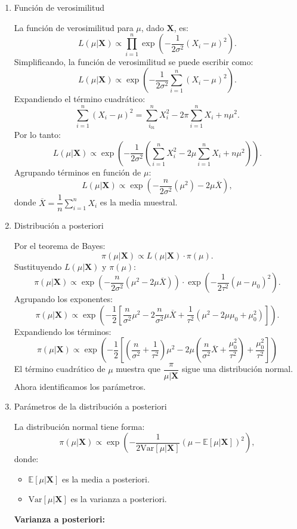 \begin{enumerate}[label=\color{red}\textbf{\arabic*)}]
\begin{enumerate}[label=Paso \arabic*:]
  \item Función de verosimilitud

    La función de verosimilitud para $\mu$, dado $\mathbf{X}$, es: \[
    L(\mu|\mathbf{X})\propto \prod_{i=1}^{n} \exp\left( -\dfrac{1}{2\sigma^2}(X_i-\mu)^2 \right).
    \] 
    Simplificando, la función de verosimilitud se puede escribir como: \[
    L(\mu|\mathbf{X})\propto \exp\left( -\dfrac{1}{2\sigma^2}\sum_{i=1}^{n} (X_i-\mu)^2 \right) .
    \] 
    Expandiendo el término cuadrático: \[
    \sum_{i=1}^{n} (X_i-\mu)^2=\sum_{i_{01}}^{n} X_i^2-2\pi \sum_{i=1}^{n} X_i+n\mu^2.
    \] 
    Por lo tanto: \[
    L(\mu|\mathbf{X})\propto \exp\left( -\dfrac{1}{2\sigma^2}\left( \sum_{i=1}^{n} X_i^2-2\mu \sum_{i=1}^{n} X_i+n\mu^2 \right)  \right) .
    \] 
    Agrupando términos en función de $\mu$: \[
    L(\mu|\mathbf{X})\propto \exp\left( -\dfrac{n}{2\sigma^2}(\mu^2)-2\mu\overline{X} \right) ,
    \] donde $\overline{X}=\dfrac{1}{n}\sum_{i=1}^{n} X_i$ es la media muestral.
  \item Distribución a posteriori

    Por el teorema de Bayes: \[
    \pi(\mu|\mathbf{X})\propto L(\mu|\mathbf{X})\cdot \pi(\mu).
    \] 
    Sustituyendo $L(\mu|\mathbf{X})$ y $\pi(\mu)$: \[
    \pi(\mu|\mathbf{X})\propto \exp\left( -\dfrac{n}{2\sigma^2}(\mu^2-2\mu\overline{X}) \right) \cdot \exp\left( -\dfrac{1}{2\tau^2}(\mu-\mu_0)^2 \right) .
    \] 
    Agrupando los exponentes: \[
    \pi(\mu|\mathbf{X})\propto \exp\left( -\dfrac{1}{2}\left[ \dfrac{n}{\sigma^2}\mu^2-2 \dfrac{n}{\sigma^2}\mu\overline{X}+\dfrac{1}{\tau^2}(\mu^2-2\mu\mu_0+\mu_0^2) \right]  \right) .
    \] 
    Expandiendo los términos: \[
    \pi(\mu|\mathbf{X})\propto \exp\left( -\dfrac{1}{2}\left[ \left( \dfrac{n}{\sigma^2}+\dfrac{1}{\tau^2} \right) \mu^2-2\mu\left( \dfrac{n}{\sigma^2}\overline{X}+\dfrac{\mu_0^2}{\tau^2} \right) +\dfrac{\mu_0^2}{\tau^2}  \right]  \right) 
    \] 
    El término cuadrático de $\mu$ muestra que $\dfrac{\pi}{\mu|\mathbf{X}}$ sigue una distribución normal. Ahora identificamos los parámetros.
  \item Parámetros de la distribución a posteriori
    
    La distribución normal tiene forma: \[
      \pi(\mu|\mathbf{X})\propto \exp\left( -\dfrac{1}{2\mathrm{Var}[\mu|\mathbf{X}]}(\mu-\mathbb{E}[\mu|\mathbf{X}])^2 \right),
    \] 
    donde:
    \begin{itemize}[label=\textbullet]
      \item $\mathbb{E}[\mu|\mathbf{X}]$ es la media a posteriori.
      \item $\mathrm{Var}[\mu|\mathbf{X}]$ es la varianza a posteriori.
    \end{itemize}
    \textbf{Varianza a posteriori:}


\end{enumerate}
\end{enumerate}
